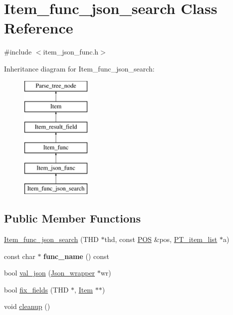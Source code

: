 \hypertarget{classItem__func__json__search}{}\section{Item\+\_\+func\+\_\+json\+\_\+search Class Reference}
\label{classItem__func__json__search}


{\ttfamily \#include $<$item\+\_\+json\+\_\+func.\+h$>$}

Inheritance diagram for Item\+\_\+func\+\_\+json\+\_\+search\+:\begin{figure}[H]
\begin{center}
\leavevmode
\includegraphics[height=6.000000cm]{classItem__func__json__search}
\end{center}
\end{figure}
\subsection*{Public Member Functions}
\begin{DoxyCompactItemize}
\item 
\mbox{\hyperlink{classItem__func__json__search_a0b76e2d9888d5bcac4633d814a3d3b8d}{Item\+\_\+func\+\_\+json\+\_\+search}} (T\+HD $\ast$thd, const \mbox{\hyperlink{structYYLTYPE}{P\+OS}} \&pos, \mbox{\hyperlink{classPT__item__list}{P\+T\+\_\+item\+\_\+list}} $\ast$a)
\item 
\mbox{\label{classItem__func__json__search_acd928126873a27e9448d509208090928}} 
const char $\ast$ {\bfseries func\+\_\+name} () const
\item 
bool \mbox{\hyperlink{classItem__func__json__search_a69fc8b718e013ca52e964ebafd54de60}{val\+\_\+json}} (\mbox{\hyperlink{classJson__wrapper}{Json\+\_\+wrapper}} $\ast$wr)
\item 
bool \mbox{\hyperlink{classItem__func__json__search_a0dfedf6959caef2f7c63e7c333e9b785}{fix\+\_\+fields}} (T\+HD $\ast$, \mbox{\hyperlink{classItem}{Item}} $\ast$$\ast$)
\item 
void \mbox{\hyperlink{classItem__func__json__search_a2c5ac3f1a34532493a36bdb37241d48d}{cleanup}} ()
\end{DoxyCompactItemize}
